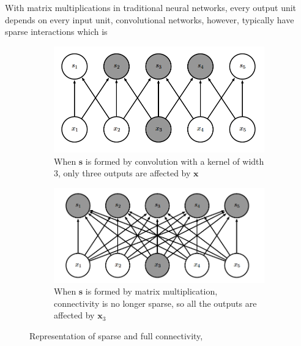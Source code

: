 \documentclass[12pt]{report}
\numberwithin{equation}{section}
\begin{document}
\noindent 
With matrix multiplications in traditional neural networks, every output unit depends on every input unit, convolutional networks, however, typically have sparse interactions which is 
\begin{figure}[H]
\centering
	\begin{subfigure}[t]{\textwidth}
	\centering
	\includegraphics[scale=0.5]{png/sparse2.png}
 	\caption{When $\bm{s}$ is formed by convolution with a kernel of width $3$, only three outputs are affected by $\bm{x}$}	 
	\label{subfig:sparse1}
	\end{subfigure}
	
	\medskip
	
	\begin{subfigure}[t]{\textwidth}
	\centering
	\includegraphics[scale=0.5]{png/sparse1.png}		
	\caption{When $\bm{s}$ is formed by matrix multiplication, connectivity is no longer sparse, so all the outputs are affected by $\bm{x}_3$}	 
	\label{subfig:sparse2}
	\end{subfigure}
\caption[Representation of sparse and full connectivity]{Representation of sparse and full connectivity, }	 
\label{fig:sparse}
\end{figure}
\noindent
\end{document}
